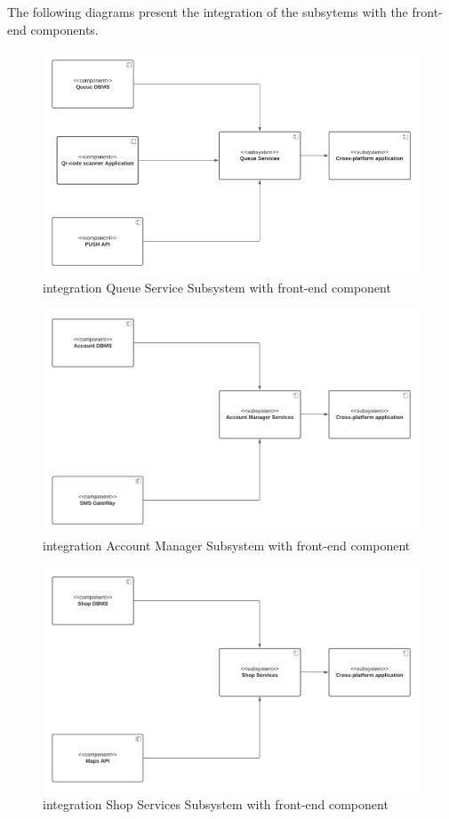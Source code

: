 The following diagrams present the integration of the subsytems with the front-end components.

\begin{figure}[h!]
    \centering
    \includegraphics[width=1\textwidth]{Images/TestDiagram/view.png}
    \caption{\label{fig:viewQueue}{integration Queue Service Subsystem with front-end component}}
\end{figure}
\FloatBarrier 
\begin{figure}[h!]
    \centering
    \includegraphics[width=1\textwidth]{Images/TestDiagram/viewAccount.png}
    \caption{\label{fig:viewAccount}{integration Account Manager Subsystem with front-end component}}
\end{figure}
\FloatBarrier 
\begin{figure}[h!]
    \centering
    \includegraphics[width=1\textwidth]{Images/TestDiagram/viewShop.png}
    \caption{\label{fig:viewAccount}{integration Shop Services Subsystem with front-end component}}
\end{figure}
\FloatBarrier 


